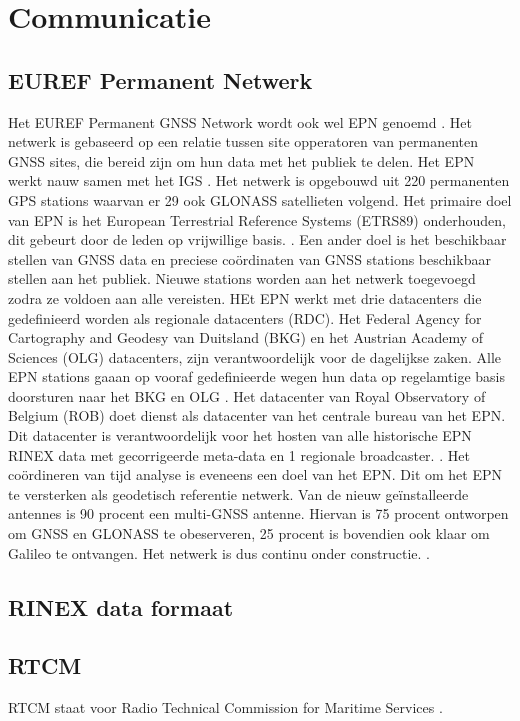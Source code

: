\section{Communicatie}
\label{LCom}
\subsection{EUREF Permanent Netwerk}
Het EUREF Permanent GNSS Network wordt ook wel EPN genoemd \cite{LBibEPN3,LBibEPN2,LBibEPN}. Het netwerk is gebaseerd op een relatie tussen site opperatoren van permanenten GNSS sites, die bereid zijn om hun data met het publiek te delen. Het EPN werkt nauw samen met het IGS \cite{LBibEPN3}. Het netwerk is opgebouwd uit 220 permanenten GPS stations waarvan er 29 ook GLONASS satellieten volgend. Het primaire doel van EPN is het European Terrestrial Reference Systems (ETRS89) onderhouden, dit gebeurt door de leden op vrijwillige basis. \cite{LBibEPN}  \cite{LBibEPN2}. Een ander doel is het beschikbaar stellen van GNSS data en preciese co\"ordinaten van GNSS stations beschikbaar stellen aan het publiek. Nieuwe stations worden aan het netwerk toegevoegd zodra ze voldoen aan alle vereisten. HEt EPN werkt met drie datacenters die gedefinieerd worden als regionale datacenters (RDC). Het Federal Agency for Cartography and Geodesy van Duitsland (BKG) en het Austrian Academy of Sciences (OLG)  datacenters, zijn verantwoordelijk voor de dagelijkse zaken. Alle EPN stations gaaan op vooraf gedefinieerde wegen hun data op regelamtige basis doorsturen naar het BKG en OLG \cite{LBibEPN2}. Het datacenter van Royal Observatory of Belgium (ROB) doet dienst als datacenter van het centrale bureau van het EPN. Dit datacenter is verantwoordelijk voor het hosten van alle historische EPN RINEX data met gecorrigeerde meta-data en 1 regionale broadcaster. \cite{LBibEPN2,LBibEPN3}. Het co\"ordineren van tijd analyse is eveneens een doel van het EPN. Dit om het EPN te versterken als geodetisch referentie netwerk. Van de nieuw ge\"installeerde antennes is 90 procent een multi-GNSS antenne. Hiervan is 75 procent ontworpen om GNSS en GLONASS te obeserveren, 25 procent is bovendien ook klaar om Galileo te ontvangen. Het netwerk is dus continu onder constructie. \cite{LBibEPN3}.

\subsection{RINEX data formaat}

\subsection{RTCM}
RTCM staat voor Radio Technical Commission for Maritime Services \cite{LBibGLONASS}.

